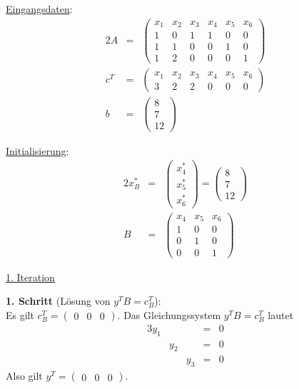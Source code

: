 \documentclass[10pt,a4paper,oneside,ngerman,numbers=noenddot]{scrartcl}
\begin{document}
		\underline{Eingangsdaten}:
		\begin{alignat*}{2}
			A &=& \begin{pmatrix}
				x_{1} & x_{2} & x_{3} & x_{4} & x_{5} & x_{6} \\
				1 & 0 & 1 & 1 & 0 & 0 \\
				1 & 1 & 0 & 0 & 1 & 0\\
				1 & 2 & 0 & 0 & 0 & 1
			\end{pmatrix} \\
			c^{T} &=& \begin{pmatrix}
				x_{1} & x_{2} & x_{3} & x_{4} & x_{5} & x_{6} \\
				3 & 2 & 2 & 0 & 0 & 0
			\end{pmatrix} \\
			b &=& \begin{pmatrix}
				8 \\
				7 \\
				12
			\end{pmatrix}
		\end{alignat*}

		\underline{Initialisierung}:
		\begin{alignat*}{2}
			x_{B}^{*} &=& \begin{pmatrix}
				x_{4}^{*} \\
				x_{5}^{*} \\
				x_{6}^{*}
			\end{pmatrix}
			=
			\begin{pmatrix}
				8 \\
				7 \\
				12
			\end{pmatrix} \\
			B &=& \begin{pmatrix}
				x_{4} & x_{5} & x_{6} \\
				1 & 0 & 0 \\
				0 & 1 & 0 \\
				0 & 0 & 1
			\end{pmatrix}
		\end{alignat*}
		
		\underline{1. Iteration}
		
		\textbf{1. Schritt} (Lösung von $y^{T}B = c_{B}^{T}$):\\
		Es gilt $c_{B}^{T} = \begin{pmatrix} 0 & 0 & 0 \end{pmatrix}$. Das Gleichungssystem $y^{T}B = c_{B}^{T}$ lautet
		\begin{alignat*}{3}
			y_{1} & & &=& 0 \\
			& y_{2} & &=& 0 \\
			& & y_{3} &=& 0
		\end{alignat*}
		Also gilt $y^{T} = \begin{pmatrix} 0 & 0 & 0 \end{pmatrix}$.
		
\end{document}
